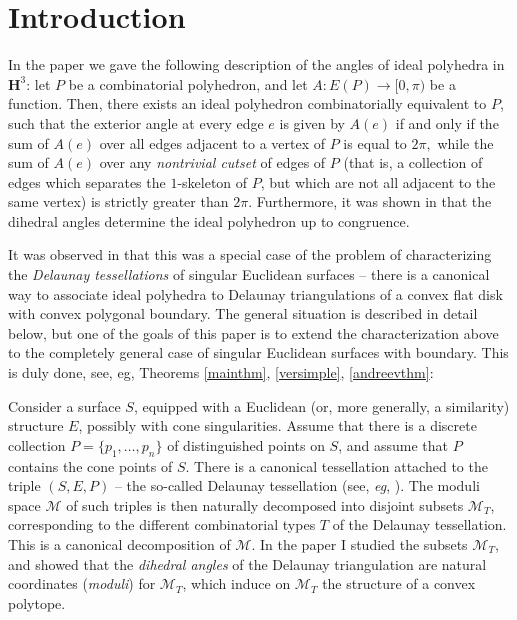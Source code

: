 \documentclass{acmart}
\begin{document}
\maketitle

\section*{Introduction}

In the paper \cite{steiner} we gave the following description of the
angles of ideal polyhedra in $\mathbf{H}^3$: let $P$ be a combinatorial
polyhedron, and let $A: E(P) \rightarrow [0, \pi)$ be a
function. Then, there exists an ideal polyhedron combinatorially
equivalent to $P$, such that the exterior angle at every edge $e$ is
given by $A(e)$ if and only if the sum of $A(e)$ over all edges
adjacent to a vertex of $P$ is equal to $2\pi,$ while the sum of
$A(e)$ over any \textit{nontrivial cutset} of edges of $P$ (that is, a
collection of edges which separates the $1$-skeleton of $P$, but which
are not all adjacent to the same vertex) is strictly greater than
$2\pi.$ Furthermore, it was shown in \cite{rvol} that the dihedral
angles determine the ideal polyhedron up to congruence.

It was observed in \cite{rivid,rvol} that this was a
special case of the problem of characterizing the  \textit{Delaunay
tessellations} of singular Euclidean surfaces -- there is a canonical
way to associate ideal polyhedra to Delaunay triangulations of a
convex flat disk with convex polygonal boundary. The general situation
is described in detail below, but one of the goals of this paper is to
extend the characterization above to the completely general case of
singular Euclidean surfaces with boundary. This is duly done, see, eg,
Theorems \ref{mainthm}, \ref{versimple}, \ref{andreevthm}:

Consider a surface $S$, equipped with a Euclidean (or, more generally,
a similarity) structure $E$, possibly
with cone singularities. Assume that there is a discrete collection
$P=\{p_1, \ldots, p_n\}$ of distinguished points on $S$, and assume
that $P$ contains the cone points of $S$. There is a canonical
tessellation attached to the  triple $(S, E, P)$ -- the so-called
Delaunay tessellation (see, \textit{eg}, \cite{be,rvol}). The moduli
space $\mathcal{M}$ of such triples is then naturally decomposed into
disjoint subsets $\mathcal{M}_T$, corresponding to the different
combinatorial 
types $T$ of the Delaunay tessellation. This is a canonical
decomposition of $\mathcal{M}$. In the paper \cite{rvol} I studied the 
subsets $\mathcal{M}_T$, and showed that the \emph{dihedral angles} of the
Delaunay triangulation are natural coordinates (\emph{moduli}) for
$\mathcal{M}_T$, which induce on $\mathcal{M}_T$ the structure of a
convex polytope. 
\end{document}
